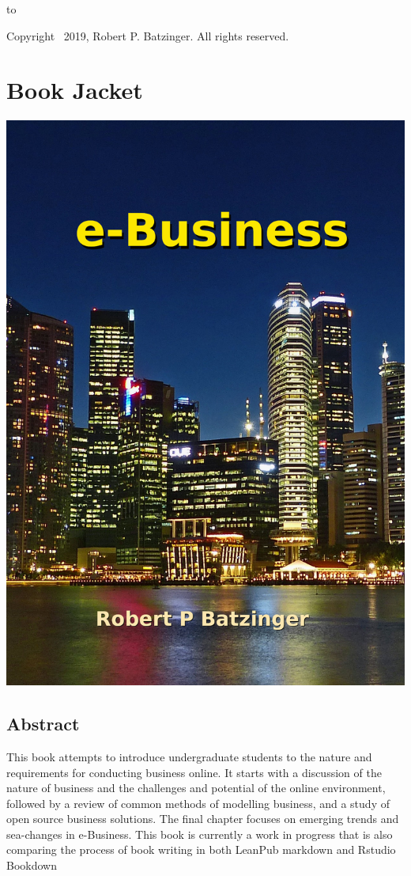 \documentclass[]{book}
\begin{document}
\vfill
\vfill
\vfill
\hbox to 
\vfill
\null
\newpage
\vfill
\begin{center}
\noindent  Copyright \textcopyright\ 2019, Robert P. Batzinger. All rights reserved.\parfillskip=0pt\par
\end{center}
\vfill
\vfill
\newpage
\frontmatter

{
\setcounter{tocdepth}{1}
\tableofcontents
}
\hypertarget{book-jacket}{%
\chapter*{Book Jacket}\label{book-jacket}}

\includegraphics[width=0.5\linewidth]{images/cover11}

\hypertarget{abstract}{%
\section*{Abstract}\label{abstract}}

This book attempts to introduce undergraduate students to the nature and requirements for conducting business online. It starts with a discussion of the nature of business and the challenges and potential of the online environment, followed by a review of common methods of modelling business, and a study of open source business solutions.
The final chapter focuses on emerging trends and sea-changes in e-Business. This book is currently a work in progress that is also comparing the process of book writing in both LeanPub markdown and Rstudio Bookdown
\end{document}
